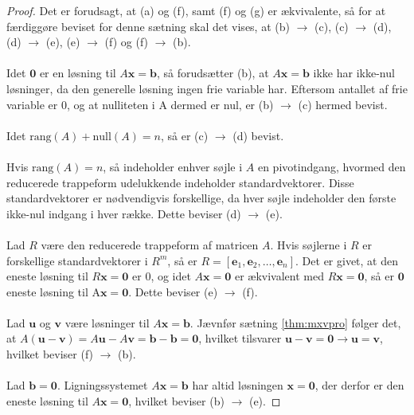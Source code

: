 \begin{proof}
\noindent
Det er forudsagt, at (a) og (f), samt (f) og (g) er ækvivalente, så for at færdiggøre beviset for denne sætning skal det vises, at (b) $\rightarrow$ (c), (c) $\rightarrow$ (d), (d) $\rightarrow$ (e), (e) $\rightarrow$ (f) og (f) $\rightarrow$ (b).
\\\\
Idet $\mathbf{0}$ er en løsning til $A\mathbf{x}=\mathbf{b}$, så forudsætter (b), at $A\mathbf{x}=\mathbf{b}$ ikke har ikke-nul løsninger, da den generelle løsning ingen frie variable har. 
Eftersom antallet af frie variable er $0$, og at nulliteten i A dermed er nul, er (b) $\rightarrow$ (c) hermed bevist. 
\\\\
Idet $\text{rang}(A)+\text{null}(A)=n$, så er (c) $\rightarrow$ (d) bevist.
\\\\
%
Hvis $\text{rang}(A)=n$, så indeholder enhver søjle i $A$ en pivotindgang, hvormed den reducerede trappeform udelukkende indeholder standardvektorer. 
Disse standardvektorer er nødvendigvis forskellige, da hver søjle indeholder den første ikke-nul indgang i hver række. 
Dette beviser (d) $\rightarrow$ (e).
%
\\\\
Lad $R$ være den reducerede trappeform af matricen $A$. Hvis søjlerne i $R$ er forskellige standardvektorer i $R^m$, så er $R= [ \mathbf{e}_1, \mathbf{e}_2, \ldots, \mathbf{e}_n]$. 
Det er givet, at den eneste løsning til $R\mathbf{x}=\mathbf{0}$ er $0$, og idet $A\mathbf{x}=\mathbf{0}$ er ækvivalent med $R\mathbf{x}=\mathbf{0}$, så er $\mathbf{0}$ eneste løsning til A$\mathbf{x}=\mathbf{0}$. 
Dette beviser (e) $\rightarrow$ (f).
\\\\
%
Lad $\mathbf{u}$ og $\mathbf{v}$ være løsninger til $A\mathbf{x}=\mathbf{b}$.
Jævnfør sætning \ref{thm:mxvpro} følger det, at $A(\mathbf{u}-\mathbf{v})=A\mathbf{u}-A\mathbf{v}=\mathbf{b}-\mathbf{b}=\mathbf{0}$, hvilket tilsvarer $\mathbf{u}-\mathbf{v}=\mathbf{0}
\rightarrow  
\mathbf{u} =\mathbf{v}$, hvilket beviser (f) $\rightarrow$ (b).
\\\\
%
Lad $\mathbf{b}=\mathbf{0}$. 
Ligningssystemet $A\mathbf{x}=\mathbf{b}$ har altid løsningen $\mathbf{x}=\mathbf{0}$, der derfor er den eneste løsning til $A\mathbf{x}=\mathbf{0}$, hvilket beviser (b) $\rightarrow$ (e).
%
\end{proof}
